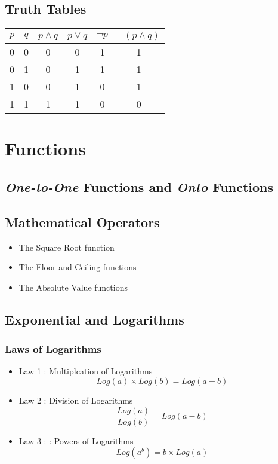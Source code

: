 \documentclass[12pt]{article}
\begin{document}
\subsection{Truth Tables}
{
\Large
\begin{center}
\begin{tabular}{|c|c||c|c||c|c|}
\hline $p$ & $q$ & $p \wedge q$ & $p\vee q$ & $\neg p$  & $\neg (p \wedge q)$ \\ 
\hline 0 & 0 & 0 & 0 & 1 & 1 \\ 
\hline 0 & 1 & 0 & 1 & 1 & 1 \\ 
\hline 1 & 0 & 0 & 1 & 0 & 1 \\ 
\hline 1 & 1 & 1 & 1 & 0 & 0 \\ 
\hline 
\end{tabular} 
\end{center}
}


\newpage
\section{Functions}

\subsection{\textit{One-to-One} Functions and \textit{Onto} Functions}


\subsection{Mathematical Operators}
\begin{itemize}
\item The Square Root function
\item The Floor and Ceiling functions
\item The Absolute Value functions
\end{itemize}

\subsection{Exponential and Logarithms}
\subsubsection*{Laws of Logarithms}

\begin{itemize}
\item Law 1 : Multiplcation of Logarithms
\[ Log(a) \times Log(b) = Log(a+b) \]
\item Law 2 : Division of Logarithms
\[ \frac{Log(a)}{Log(b)} = Log(a-b) \]
\item Law 3 : : Powers of Logarithms
\[ Log(a^b) = b \times Log(a) \]
\end{itemize}
\end{document}
